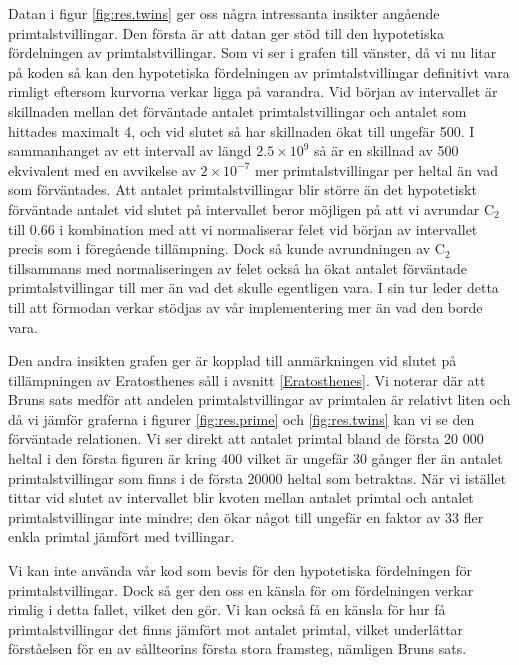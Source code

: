 Datan i figur \ref{fig:res.twins} ger oss några intressanta insikter angående primtalstvillingar. 
Den första är att datan ger stöd till den hypotetiska fördelningen av primtalstvillingar. 
Som vi ser i grafen till vänster, då vi nu litar på koden så kan den hypotetiska fördelningen av primtalstvillingar definitivt vara rimligt eftersom kurvorna verkar ligga på varandra.
Vid början av intervallet är skillnaden mellan det förväntade antalet primtalstvillingar och antalet som hittades maximalt 4, och vid slutet så har skillnaden ökat till ungefär 500.
I sammanhanget av ett intervall av längd \(2.5\times10^9\) så är en skillnad av 500 ekvivalent med en avvikelse av \(2\times 10^{-7}\) mer primtalstvillingar per heltal än vad som förväntades.
Att antalet primtalstvillingar blir större än det hypotetiskt förväntade antalet vid slutet på intervallet beror möjligen på att vi avrundar \(\text{C}_2\) till 0.66 i kombination med att vi normaliserar felet vid början av intervallet precis som i föregående tillämpning.
Dock så kunde avrundningen av \(\text{C}_2\) tillsammans med normaliseringen av felet också ha ökat antalet förväntade primtalstvillingar till mer än vad det skulle egentligen vara. 
I sin tur leder detta till att förmodan verkar stödjas av vår implementering mer än vad den borde vara.

Den andra insikten grafen ger är kopplad till anmärkningen vid slutet på tillämpningen av Eratosthenes såll i avsnitt \ref{Eratosthenes}.
Vi noterar där att Bruns sats medför att andelen primtalstvillingar av primtalen är relativt liten och då vi jämför graferna i figurer \ref{fig:res.prime} och \ref{fig:res.twins} kan vi se den förväntade relationen.
Vi ser direkt att antalet primtal bland de första 20 000 heltal i den första figuren är kring 400 vilket är ungefär 30 gånger fler än antalet primtalstvillingar som finns i de första 20000 heltal som betraktas.
När vi istället tittar vid slutet av intervallet blir kvoten mellan antalet primtal och antalet primtalstvillingar inte mindre; den ökar något till ungefär en faktor av 33 fler enkla primtal jämfört med tvillingar.

Vi kan inte använda vår kod som bevis för den hypotetiska fördelningen för primtalstvillingar. 
Dock så ger den oss en känsla för om fördelningen verkar rimlig i detta fallet, vilket den gör. Vi kan också få en känsla för hur få primtalstvillingar det finns jämfört mot antalet primtal, vilket underlättar förståelsen för en av sållteorins första stora framsteg, nämligen Bruns sats.


